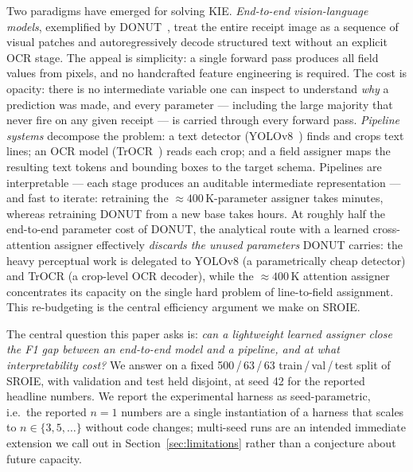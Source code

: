 \documentclass[conference]{IEEEtran}
\begin{document}
Two paradigms have emerged for solving KIE.
\emph{End-to-end vision-language models}, exemplified by
DONUT~\cite{kim2022donut}, treat the entire receipt image as a sequence
of visual patches and autoregressively decode structured text without an
explicit OCR stage.  The appeal is simplicity: a single forward pass
produces all field values from pixels, and no handcrafted feature
engineering is required.  The cost is opacity: there is no intermediate
variable one can inspect to understand \emph{why} a prediction was made,
and every parameter --- including the large majority that never fire on
any given receipt --- is carried through every forward pass.
\emph{Pipeline systems} decompose the problem: a text detector
(YOLOv8~\cite{jocher2023yolov8}) finds and crops text lines;
an OCR model (TrOCR~\cite{li2023trocr}) reads each crop;
and a field assigner maps the resulting text tokens and bounding boxes
to the target schema.  Pipelines are interpretable --- each stage
produces an auditable intermediate representation --- and fast to
iterate: retraining the $\approx400\,$K-parameter
assigner takes minutes, whereas
retraining DONUT from a new base takes hours.
At roughly half the end-to-end parameter cost of DONUT, the analytical
route with a learned cross-attention assigner effectively \emph{discards
the unused parameters} DONUT carries: the heavy perceptual work is
delegated to YOLOv8 (a parametrically cheap detector) and TrOCR (a
crop-level OCR decoder), while the $\approx400\,$K
attention assigner concentrates its capacity on the single hard problem
of line-to-field assignment.  This re-budgeting is the central
efficiency argument we make on SROIE.

The central question this paper asks is: \emph{can a lightweight
learned assigner close the F1 gap between an end-to-end model and a
pipeline, and at what interpretability cost?}  We answer on a fixed
500\,/\,63\,/\,63 train\,/\,val\,/\,test split of SROIE, with
validation and test held disjoint, at seed 42 for the reported
headline numbers.  We report the experimental harness as
seed-parametric, i.e.\ the reported $n{=}1$ numbers are a single
instantiation of a harness that scales to $n\in\{3,5,\ldots\}$
without code changes; multi-seed runs are an intended immediate
extension we call out in Section~\ref{sec:limitations} rather than a
conjecture about future capacity.
\end{document}
